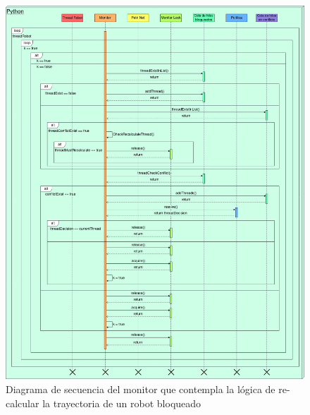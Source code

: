 \begin{figure}[H]
   \centering
   \hspace*{-2,0cm}
   \includegraphics[width=1.3\linewidth]{images/diagrama_monitor_recalculate_path.jpg}
   \caption{Diagrama de secuencia del monitor que contempla la lógica de re-calcular la trayectoria de un robot bloqueado}
   \label{fig:diagrama_monitor_recalculate_path}
\end{figure}